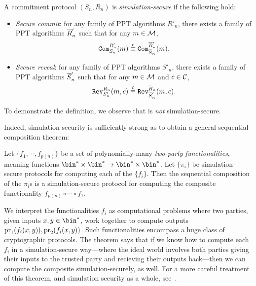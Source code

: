 \begin{dfn}
	A commitment protocol $(S_n, R_n)$ is \emph{simulation-secure} if the
	following hold:

	\begin{itemize}
		\item \emph{Secure commit}: for any family of PPT algorithms $R'_n$, there
		      exists a family of PPT algorithms ${\overline{R}}'_n$ such that for any
		      $m\in\mathcal{M}$,
		      \[
			      {\texttt{Com}}_{S_n}^{R'_n}(m) \overset{\text{c}}{\equiv}{\texttt{Com}}_{{\overline{S}}_n}^{{\overline{R}}'_n}(m).
		      \]
		\item \emph{Secure reveal}: for any family of PPT algorithms $S'_n$,
		      there exists a family of PPT algorithms ${\overline{S}}'_n$ such that for any
		      $m\in\mathcal{M}$ and $c\in\mathcal{C}$, \[
			      {\texttt{Rev}}_{S'_n}^{R_n}(m, c) \overset{\text{c}}{\equiv}{\texttt{Rev}}_{{\overline{S}}'_n}^{{\overline{R}}_n}(m, c).
		      \]
	\end{itemize}
\end{dfn}

\noindent
To demonstrate the definition, we observe that  is \emph{not}
simulation-secure.

Indeed, simulation security is sufficiently strong as to obtain a general
sequential composition theorem:

\begin{thm}\label{thm:sequential composition for simulation security}
	Let $\{f_1,\cdots,f_{p(n)}\}$ be a set of polynomially-many \emph{two-party
		functionalities}, meaning functions
	$\bin^*\times\bin^*\rightarrow\bin^*\times\bin^*$. Let $\{\pi_i\}$ be
	simulation-secure protocols for computing each of the $\{f_i\}$. Then the
	sequential composition of the $\pi_i$s is a simulation-secure protocol for
	computing the composite functionality $f_{p(n)}\circ\cdots\circ f_1$.
\end{thm}

\noindent
We interpret the functionalities $f_i$ as computational problems where two
parties, given inputs $x,y\in\bin^*$, work together to compute outputs
$\text{pr}_1(f_i(x, y)), \text{pr}_2(f_i(x, y))$. Such functionalities encompass a huge
class of cryptographic protocols. The theorem says that if we know how to
compute each $f_i$ in a simulation-secure way---where the ideal world involves
both parties giving their inputs to the trusted party and recieving their
outputs back---then we can compute the composite simulation-securely, as well.
For a more careful treatment of this theorem, and simulation security as a whole,
see~\cite{lindell-2017}.

